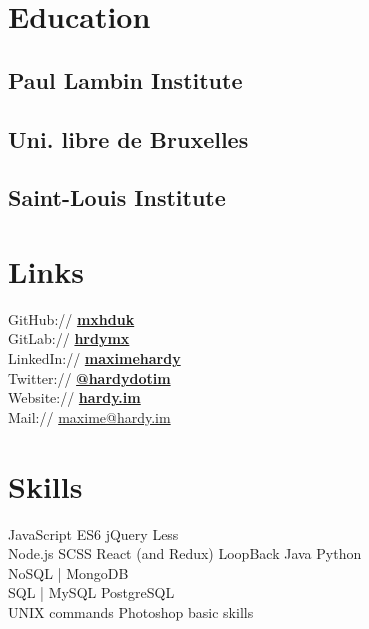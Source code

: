 \documentclass[]{my-resume}
\begin{document}
\begin{minipage}[t]{0.33\textwidth} 


\section{Education} 

\subsection{Paul Lambin Institute}
\sectionsep

\subsection{Uni. libre de Bruxelles}
\sectionsep

\subsection{Saint-Louis Institute}
\sectionsep


\section{Links} 
GitHub:// \href{https://github.com/mxhuk}{\bf mxhduk} \\
GitLab:// \href{https://gitlab.com/hrdymx}{\bf hrdymx} \\
LinkedIn:// \href{https://www.linkedin.com/in/maximehardy}{\bf maximehardy} \\
Twitter:// \href{https://twitter.com/hardydotim}{\bf @hardydotim} \\
Website:// \href{http://hardy.im}{\bf hardy.im} \\
Mail:// \href{mailto:maxime@hardy.im}{maxime@hardy.im}
\sectionsep


\section{Skills}
JavaScript ES6 \textbullet{} jQuery \textbullet{} Less \\
Node.js \textbullet{} SCSS \textbullet{} React (and Redux) \textbullet{} LoopBack \textbullet{} Java \textbullet{} Python \\
NoSQL | MongoDB \\
SQL | MySQL \textbullet{} PostgreSQL \\
UNIX commands \textbullet{} Photoshop basic skills
\sectionsep


\end{minipage}
\end{document}
